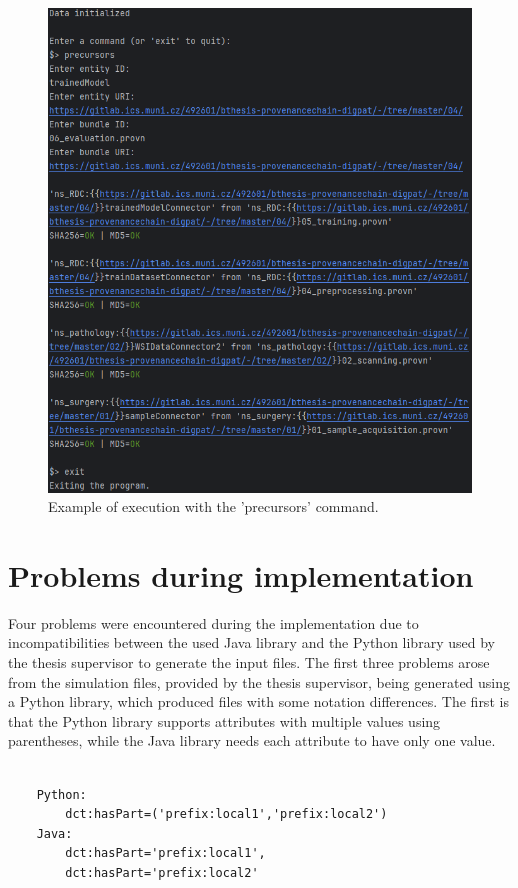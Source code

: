 \documentclass[
  digital,     %
  oneside,     %
  nosansbold,  %
  nocolorbold, %
  lof,         %
  lot,         %
]{fithesis4}
\begin{document}
\begin{figure}[htbp]
  \begin{center}
    \includegraphics[width=12.5cm]{fithesis/images/precursor-run-slim.png}
  \end{center}
  \caption{Example of execution with the 'precursors' command.}
  \label{fig:precursor-run}
\end{figure}

\section{Problems during implementation}
Four problems were encountered during the implementation due to incompatibilities between the used Java library and the Python library used by the thesis supervisor to generate the input files. The first three problems arose from the simulation files, provided by the thesis supervisor, being generated using a Python library, which produced files with some notation differences. The first is that the Python library supports attributes with multiple values using parentheses, while the Java library needs each attribute to have only one value.

\begin{verbatim}

    Python: 
        dct:hasPart=('prefix:local1','prefix:local2')
    Java:
        dct:hasPart='prefix:local1', 
        dct:hasPart='prefix:local2' 
        
\end{verbatim}
\end{document}
